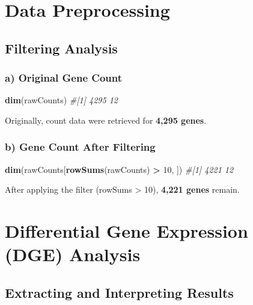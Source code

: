 \documentclass[
  11pt,
]{article}
\newenvironment{Shaded}{\begin{snugshade}}{\end{snugshade}}
\newcommand{\CommentTok}[1]{\textcolor[rgb]{0.56,0.35,0.01}{\textit{#1}}}
\newcommand{\DecValTok}[1]{\textcolor[rgb]{0.00,0.00,0.81}{#1}}
\newcommand{\FunctionTok}[1]{\textcolor[rgb]{0.13,0.29,0.53}{\textbf{#1}}}
\newcommand{\NormalTok}[1]{#1}
\newcommand{\SpecialCharTok}[1]{\textcolor[rgb]{0.81,0.36,0.00}{\textbf{#1}}}
\begin{document}
\section{Data Preprocessing}\label{data-preprocessing}

\subsection{Filtering Analysis}\label{filtering-analysis}

\subsubsection{a) Original Gene Count}\label{a-original-gene-count}

\begin{Shaded}
\begin{Highlighting}[]
\FunctionTok{dim}\NormalTok{(rawCounts)}
\CommentTok{\#[1] 4295   12}
\end{Highlighting}
\end{Shaded}

Originally, count data were retrieved for \textbf{4,295 genes}.

\subsubsection{b) Gene Count After
Filtering}\label{b-gene-count-after-filtering}

\begin{Shaded}
\begin{Highlighting}[]
\FunctionTok{dim}\NormalTok{(rawCounts[}\FunctionTok{rowSums}\NormalTok{(rawCounts) }\SpecialCharTok{\textgreater{}} \DecValTok{10}\NormalTok{, ])}
\CommentTok{\#[1] 4221   12}
\end{Highlighting}
\end{Shaded}

After applying the filter (rowSums \textgreater{} 10), \textbf{4,221
genes} remain.

\newpage

\section{Differential Gene Expression (DGE)
Analysis}\label{differential-gene-expression-dge-analysis}

\subsection{Extracting and Interpreting
Results}\label{extracting-and-interpreting-results}
\end{document}
